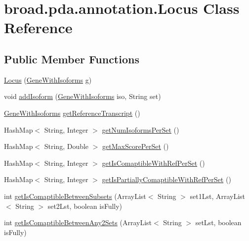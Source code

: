 \hypertarget{classbroad_1_1pda_1_1annotation_1_1_locus}{\section{broad.\+pda.\+annotation.\+Locus Class Reference}
\label{classbroad_1_1pda_1_1annotation_1_1_locus}
}
\subsection*{Public Member Functions}
\begin{DoxyCompactItemize}
\item 
\hyperlink{classbroad_1_1pda_1_1annotation_1_1_locus_aa08c1c0494f7dfae5a28a9fa5f9d8bfb}{Locus} (\hyperlink{classbroad_1_1pda_1_1gene_1_1_gene_with_isoforms}{Gene\+With\+Isoforms} g)
\item 
void \hyperlink{classbroad_1_1pda_1_1annotation_1_1_locus_aabadd54c82a3349ef4e9bc7c8040265e}{add\+Isoform} (\hyperlink{classbroad_1_1pda_1_1gene_1_1_gene_with_isoforms}{Gene\+With\+Isoforms} iso, String set)
\item 
\hyperlink{classbroad_1_1pda_1_1gene_1_1_gene_with_isoforms}{Gene\+With\+Isoforms} \hyperlink{classbroad_1_1pda_1_1annotation_1_1_locus_ab0a21b52c4209efeb94b69cd092ab55f}{get\+Reference\+Transcript} ()
\item 
Hash\+Map$<$ String, Integer $>$ \hyperlink{classbroad_1_1pda_1_1annotation_1_1_locus_a7a094d4a22f912ce3659c27f063e573c}{get\+Num\+Isoforms\+Per\+Set} ()
\item 
Hash\+Map$<$ String, Double $>$ \hyperlink{classbroad_1_1pda_1_1annotation_1_1_locus_a8aa215097798926bce3723075eb05056}{get\+Max\+Score\+Per\+Set} ()
\item 
Hash\+Map$<$ String, Integer $>$ \hyperlink{classbroad_1_1pda_1_1annotation_1_1_locus_a51ec31985ddc969f74872a2eae4fbe80}{get\+Is\+Comaptible\+With\+Ref\+Per\+Set} ()
\item 
Hash\+Map$<$ String, Integer $>$ \hyperlink{classbroad_1_1pda_1_1annotation_1_1_locus_adf5e06cedc03a242dc6916dccd077071}{get\+Is\+Partially\+Comaptible\+With\+Ref\+Per\+Set} ()
\item 
int \hyperlink{classbroad_1_1pda_1_1annotation_1_1_locus_ae84317b60ac2dd9b071db1c9a1301a2c}{get\+Is\+Comaptible\+Between\+Subsets} (Array\+List$<$ String $>$ set1\+Lst, Array\+List$<$ String $>$ set2\+Lst, boolean is\+Fully)
\item 
int \hyperlink{classbroad_1_1pda_1_1annotation_1_1_locus_a9ba15abbca6aba31e688c956dc321b3c}{get\+Is\+Comaptible\+Between\+Any2\+Sets} (Array\+List$<$ String $>$ set\+Lst, boolean is\+Fully)

\end{DoxyCompactItemize}
